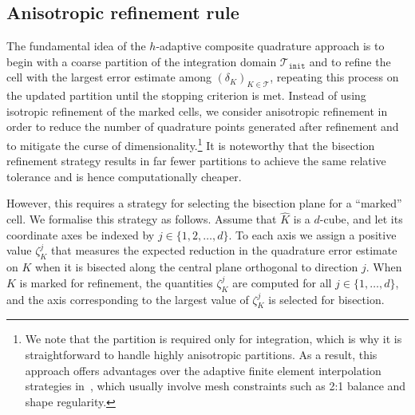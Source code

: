 \documentclass[oneside,reqno,11pt,a4paper]{amsart}
\theoremstyle{definition}
\newcommand{\TT}{\mathcal{T}}
\newcommand{\T}{\mathcal{T}}
\begin{document}
\subsection{Anisotropic refinement
rule}\label{subsec:anisotropic-refinement-rules}

The fundamental idea of the $h$-adaptive composite quadrature approach is to begin
with a coarse partition of the integration domain $\TT_{\texttt{init}}$ and to
refine the cell with the largest error estimate among $(\delta_K)_{K \in \T}$,
repeating this process on the updated partition until the stopping criterion is
met. Instead of using isotropic refinement of the marked cells, we consider
anisotropic refinement in order to reduce the number of quadrature points
generated after refinement and to mitigate the curse of dimensionality.\footnote{We note that the partition is required only for integration, which is why it is straightforward to handle highly anisotropic partitions. As a result, this approach offers advantages over the adaptive finite element interpolation strategies in~\cite{AdaptiveFEINNs2024,CompatibleFEINNs}, which usually involve mesh constraints such as 2:1 balance and shape regularity.} It is noteworthy
that the bisection refinement strategy results in far fewer partitions to
achieve the same relative tolerance and is hence computationally cheaper.

However, this requires a strategy for selecting the bisection plane for a
``marked'' cell. We formalise this strategy as follows. Assume that
$\widehat K$ is a $d$-cube, and let its coordinate axes be indexed by
$j \in \{1,2, \ldots, d\}$. To each axis we assign a positive value
$\zeta^j_K$ that measures the expected reduction in the quadrature error
estimate on $K$ when it is bisected along the central plane orthogonal to
direction $j$. When $K$ is marked for refinement, the quantities $\zeta^j_K$
are computed for all $j \in \{1, \ldots, d\}$, and the axis corresponding to
the largest value of $\zeta^j_K$ is selected for bisection.
\end{document}
